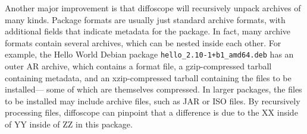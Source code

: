 \begin{itemize}
Another major improvement is that diffoscope will recursively unpack 
archives of many kinds.  Package formats are usually just standard archive
formats, with additional fields that indicate metadata for the package.  In
fact, many archive formats contain several archives, which can be nested
inside each other.
For example, the Hello World Debian package \texttt{hello\_2.10-1+b1\_amd64.deb} has an outer AR archive,
which contains
	a format file,
	a gzip-compressed tarball containing metadata,
	and an xzip-compressed tarball containing the files to be installed---%
	some of which are themselves compressed.
In larger packages, the files to be installed may include archive files, such as JAR or ISO files.
By
recursively processing files, diffoscope can pinpoint that a difference is
due to the XX inside of YY inside of ZZ in this package.

\end{itemize}
